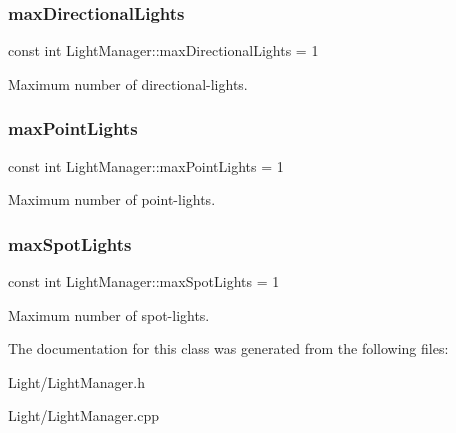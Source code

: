 \subsubsection{\texorpdfstring{maxDirectionalLights}{maxDirectionalLights}}
{\footnotesize\ttfamily const int Light\+Manager\+::max\+Directional\+Lights = 1\hspace{0.3cm}{\ttfamily [static]}}

Maximum number of directional-\/lights. \mbox{\label{class_light_manager_a9144bde2784500d384280660de2460ae}} 
\subsubsection{\texorpdfstring{maxPointLights}{maxPointLights}}
{\footnotesize\ttfamily const int Light\+Manager\+::max\+Point\+Lights = 1\hspace{0.3cm}{\ttfamily [static]}}

Maximum number of point-\/lights. \mbox{\label{class_light_manager_ab805ba7944bb72374cd02bbae19dfd08}} 
\subsubsection{\texorpdfstring{maxSpotLights}{maxSpotLights}}
{\footnotesize\ttfamily const int Light\+Manager\+::max\+Spot\+Lights = 1\hspace{0.3cm}{\ttfamily [static]}}

Maximum number of spot-\/lights. 

The documentation for this class was generated from the following files\+:\begin{DoxyCompactItemize}
\item 
Light/Light\+Manager.\+h\item 
Light/Light\+Manager.\+cpp\end{DoxyCompactItemize}
